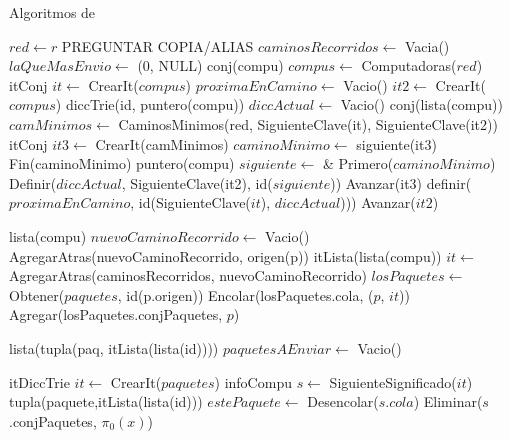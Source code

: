 \begin{Algoritmos}


\begin{algorithm}
  \caption{Algoritmos de }


\begin{algorithmic}[1]
  \State $red \gets r$  PREGUNTAR COPIA/ALIAS
  \State $caminosRecorridos \gets$ Vacia()
  \State $laQueMasEnvio \gets$ (0, NULL)
  \State conj(compu) $compus \gets$ Computadoras($red$)
  \State itConj $it \gets$ CrearIt($compus$)
  \State $proximaEnCamino \gets$ Vacio()
    \State {} $it2 \gets$ CrearIt($compus$)
    \State diccTrie(id, puntero(compu)) $diccActual \gets$ Vacio()
      \State conj(lista(compu)) $camMinimos \gets$ CaminosMinimos(red, SiguienteClave(it), SiguienteClave(it2))
      \State itConj $it3 \gets$ CrearIt(camMinimos)
      \State $caminoMinimo \gets$ siguiente(it3)
      \State Fin(caminoMinimo)
      \State puntero(compu) $siguiente \gets$ \& Primero($caminoMinimo$)
      \State Definir($diccActual$, SiguienteClave(it2), id($siguiente$))
      \State Avanzar(it3)            
    \EndWhile
    \State definir($proximaEnCamino$, id(SiguienteClave($it$), $diccActual$)))
    \State Avanzar($it2$)
  \EndWhile
   
  \EndProcedure
\end{algorithmic}


\begin{algorithmic}[1]
   \State lista(compu) $nuevoCaminoRecorrido \gets$ Vacio()
   \State AgregarAtras(nuevoCaminoRecorrido, origen(p))
   \State itLista(lista(compu)) $it \gets$ AgregarAtras(caminosRecorridos, nuevoCaminoRecorrido)
   \State $losPaquetes \gets $ Obtener($paquetes$, id(p.origen))
   \State Encolar(losPaquetes.cola, ($p$, $it$))
   \State Agregar(losPaquetes.conjPaquetes, $p$)
  \EndProcedure
\end{algorithmic}


\begin{algorithmic}[1]
  
  \State lista(tupla(paq, itLista(lista(id)))) $paquetesAEnviar \gets$ Vacio()
  
  \State itDiccTrie $it \gets$ CrearIt($paquetes$)
  	\State infoCompu $s \gets$ SiguienteSignificado($it$) 
  		\State tupla(paquete,itLista(lista(id))) $estePaquete \gets$ Desencolar($s$.$cola$)
  		\State Eliminar($s$.conjPaquetes, $\pi_0(x)$)
      		

\end{algorithmic}
\end{algorithm}
\end{Algoritmos}
